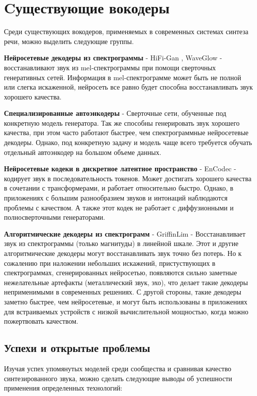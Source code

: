 \section{Cуществующие вокодеры}
Среди существующих вокодеров, применяемых в современных системах синтеза речи, можно выделить следующие группы.

\textbf{Нейросетевые декодеры из спектрограммы} - HiFi-Gan \cite{hifigan}, WaveGlow \cite{WaveGlow} - восстанавливают звук из mel-спектрограммы
при помощи сверточных генеративных сетей. Информация в mel-спектрограмме может быть не полной или слегка искаженной, 
нейросеть все равно будет способна восстанавливать звук хорошего качества.

\textbf{Специализированные автоэнкодеры} - Сверточные сети, обученные под конкретную модель генератора. Так же способны генерировать звук хорошего качества, 
при этом часто работают быстрее, чем спектрограммные нейросетевые декодеры. Однако, под конкретную задачу и модель чаще всего требуется обучать отдельный 
автоэнкодер на большом объеме данных.

\textbf{Нейросетевые кодеки в дискретное латентное пространство} - EnCodec \cite{encodec} - кодирует звук в последовательность токенов. 
Может достигать хорошего качества в сочетании с трансформерами, и работает относительно быстро. Однако, в приложениях с большим разнообразием звуков и интонаций 
наблюдаются проблемы с качеством. А также этот кодек не работает с диффузионными и полносверточными генераторами.

\textbf{Алгоритмические декодеры из спектрограмм} - GriffinLim \cite{1164317} - Восстанавливает звук из спектрограммы (только магнитуды) в линейной шкале. 
Этот и другие алгоритмические декодеры могут восстанавливать звук точно без потерь. Но к сожалению при наложении небольших искажений,
пристуствующих в спектрограммах, сгенерированных нейросетью, появляются сильно заметные нежелательные артефакты (металлический звук, эхо), 
что делает такие декодеры неприменимыми в современных решениях. С другой стороны, такие декодеры заметно быстрее, чем нейросетевые, 
и могут быть использованы в приложениях для встраиваемых устройств с низкой вычислительной мощностью, когда можно пожертвовать качеством.


\subsection{Успехи и открытые проблемы}
Изучая успех упомянутых моделей среди сообщества и сравнивая качество синтезированного звука, можно сделать следующие выводы об успешности применения определенных технологий:

